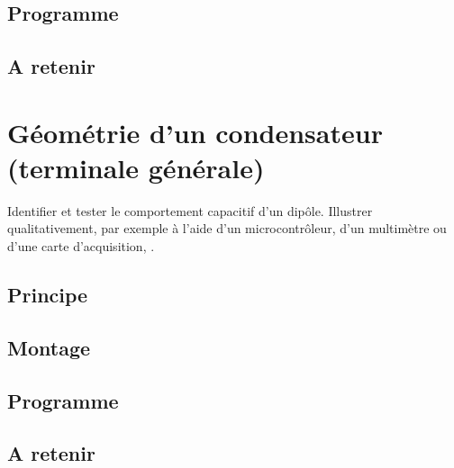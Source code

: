 \documentclass[a4paper,10pt,french]{book}
\begin{document}
\subsection{Programme}
\label{\detokenize{4_lycee/5_premiere_pression_statique_fluide:programme}}

\subsection{A retenir}
\label{\detokenize{4_lycee/5_premiere_pression_statique_fluide:a-retenir}}

\section{Géométrie d’un condensateur (terminale générale)}
\label{\detokenize{4_lycee/6_terminale_condensateur_geometrie:geometrie-d-un-condensateur-terminale-generale}}\label{\detokenize{4_lycee/6_terminale_condensateur_geometrie::doc}}
\begin{sphinxShadowBox}

Identifier et tester le comportement capacitif d’un dipôle. Illustrer qualitativement, par exemple à l’aide d’un microcontrôleur, d’un multimètre ou d’une carte d’acquisition, .
\end{sphinxShadowBox}


\subsection{Principe}
\label{\detokenize{4_lycee/6_terminale_condensateur_geometrie:principe}}

\subsection{Montage}
\label{\detokenize{4_lycee/6_terminale_condensateur_geometrie:montage}}

\subsection{Programme}
\label{\detokenize{4_lycee/6_terminale_condensateur_geometrie:programme}}

\subsection{A retenir}
\label{\detokenize{4_lycee/6_terminale_condensateur_geometrie:a-retenir}}
\end{document}

